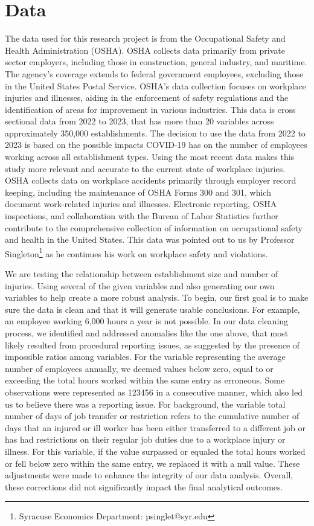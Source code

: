 \documentclass[12pt]{article}
\begin{document}
\section{Data}
\label{sec:data}

The data used for this research project is from the Occupational Safety and Health Administration (OSHA). OSHA collects data primarily from private sector employers, including those in construction, general industry, and maritime. The agency's coverage extends to federal government employees, excluding those in the United States Postal Service. OSHA's data collection focuses on workplace injuries and illnesses, aiding in the enforcement of safety regulations and the identification of areas for improvement in various industries. This data is cross sectional data from 2022 to 2023, that has more than 20 variables across approximately 350,000 establishments. The decision to use the data from 2022 to 2023 is based on the possible impacts COVID-19 has on the number of employees working across all establishment types. Using the most recent data makes this study more relevant and accurate to the current state of workplace injuries. OSHA collects data on workplace accidents primarily through employer record keeping, including the maintenance of OSHA Forms 300 and 301, which document work-related injuries and illnesses. Electronic reporting, OSHA inspections, and collaboration with the Bureau of Labor Statistics further contribute to the comprehensive collection of information on occupational safety and health in the United States. This data was pointed out to us by Professor Singleton\thanks{Syracuse Economics Department: psinglet@syr.edu} as he continues his work on workplace safety and violations.
   
We are testing the relationship between establishment size and number of injuries. Using several of the given variables and also generating our own variables to help create a more robust analysis. To begin, our first goal is to make sure the data is clean and that it will generate usable conclusions. For example, an employee working 6,000 hours a year is not possible. In our data cleaning process, we identified and addressed anomalies like the one above, that most likely resulted from procedural reporting issues, as suggested by the presence of impossible ratios among variables. For the variable representing the average number of employees annually, we deemed values below zero, equal to or exceeding the total hours worked within the same entry as erroneous. Some observations were represented as 123456 in a consecutive manner, which also led us to believe there was a reporting issue. For background, the variable total number of days of job transfer or restriction refers to the cumulative number of days that an injured or ill worker has been either transferred to a different job or has had restrictions on their regular job duties due to a workplace injury or illness. For this variable, if the value surpassed or equaled the total hours worked or fell below zero within the same entry, we replaced it with a null value.  These adjustments were made to enhance the integrity of our data analysis. Overall, these corrections did not significantly impact the final analytical outcomes.
    
\end{document}
